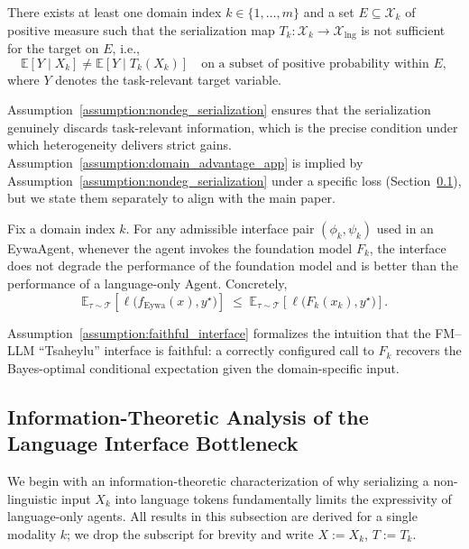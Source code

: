 \begin{assumption}
\label{assumption:nondeg_serialization}
There exists at least one domain index $k\in\{1,\dots,m\}$ and a set $E\subseteq\mathcal{X}_k$ of positive measure such that the serialization map $T_k:\mathcal{X}_k\to\mathcal{X}_{\mathrm{lng}}$ is not sufficient for the target on $E$, i.e.,
\begin{equation}
\mathbb{E}[Y\mid X_k]\neq \mathbb{E}[Y\mid T_k(X_k)] \quad \text{on a subset of positive probability within }E,
\end{equation}
where $Y$ denotes the task-relevant target variable.
\end{assumption}

Assumption~\ref{assumption:nondeg_serialization} ensures that the serialization genuinely discards task-relevant information, which is the precise condition under which heterogeneity delivers strict gains. Assumption~\ref{assumption:domain_advantage_app} is implied by Assumption~\ref{assumption:nondeg_serialization} under a specific loss (Section~\ref{app:info}), but we state them separately to align with the main paper.

\begin{assumption}
\label{assumption:faithful_interface}
Fix a domain index $k$. For any admissible interface pair $(\phi_k,\psi_k)$ used in an EywaAgent, whenever the agent invokes the foundation model $F_k$, the interface does not degrade the performance of the foundation model and is better than the performance of a language-only Agent. Concretely,
\[
\mathbb{E}_{\tau\sim\mathcal{T}}\!\left[\ell\big(f_{\mathrm{Eywa}}(x),y^\star\big)\right]
\;\le\;
\mathbb{E}_{\tau\sim\mathcal{T}}\!\left[\ell\big(F_k(x_k),y^\star\big)\right].
\]
\end{assumption}

Assumption~\ref{assumption:faithful_interface} formalizes the intuition that the FM--LLM ``Tsaheylu'' interface is faithful: a correctly configured call to $F_k$ recovers the Bayes-optimal conditional expectation given the domain-specific input.


\subsection{Information-Theoretic Analysis of the Language Interface Bottleneck}
\label{app:info}

We begin with an information-theoretic characterization of why serializing a non-linguistic input $X_k$ into language tokens fundamentally limits the expressivity of language-only agents. All results in this subsection are derived for a single modality $k$; we drop the subscript for brevity and write $X:=X_k$, $T:=T_k$.

